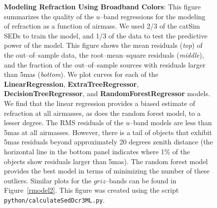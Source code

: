 \documentclass[DM,toc]{lsstdoc}
\begin{document}
\begin{figure}[!t]
    \centering
    \caption{{\bf Modeling Refraction Using Broadband Colors}: This
      figure summarizes the quality of the $u$--band regressions for
      the modeling of refraction as a function of airmass.  We used
      2/3 of the catSim SEDs to train the model, and 1/3 of the data
      to test the predictive power of the model.  This figure shows
      the mean residuals ({\it top}) of the out--of--sample data, the
      root--mean--square residuals ({\it middle}), and the fraction of
      the out--of--sample sources with residuals larger than 5mas
      ({\it bottom}).  We plot curves for each of the {\bf
        LinearRegression}, {\bf ExtraTreeRegressor}, {\bf
        DecisionTreeRegressor}, and {\bf RandomForestRegressor}
      models.  We find that the linear regression provides a biased
      estimate of refraction at all airmasses, as does the random
      forest model, to a lesser degree.  The RMS residuals of the
      $u$--band models are less than 5mas at all airmasses.  However,
      there is a tail of objects that exhibit 5mas residuals beyond
      approximately 20 degrees zenith distance (the horizontal line in
      the bottom panel indicates where 1\% of the objects show
      residuals larger than 5mas).  The random forest model provides
      the best model in terms of minimizing the number of these
      outliers.  Similar plots for the $griz$--bands can be found in
      Figure~\ref{rmodel2}.  This figure was created using the script
      {\tt python/calculateSedDcr3ML.py}.}
    \label{rmodel}
\end{figure}
\end{document}
